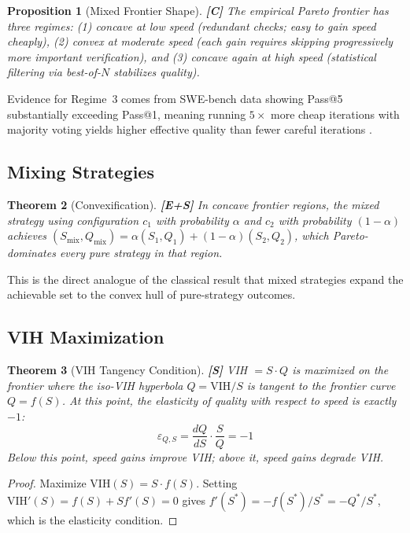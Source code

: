 \documentclass[11pt,a4paper]{article}
\newtheorem{theorem}{Theorem}[section]
\newtheorem{proposition}[theorem]{Proposition}
\theoremstyle{definition}
\theoremstyle{remark}
\newcommand{\VIH}{\mathrm{VIH}}
\begin{document}
\begin{proposition}[Mixed Frontier Shape]\label{prop:shape}
\textbf{[C]} The empirical Pareto frontier has three regimes: (1) concave at low speed (redundant checks; easy to gain speed cheaply), (2) convex at moderate speed (each gain requires skipping progressively more important verification), and (3) concave again at high speed (statistical filtering via best-of-$N$ stabilizes quality).
\end{proposition}

Evidence for Regime~3 comes from SWE-bench data showing Pass@5 substantially exceeding Pass@1, meaning running $5\times$ more cheap iterations with majority voting yields higher effective quality than fewer careful iterations \citep{sweeffi2025}.

\subsection{Mixing Strategies}

\begin{theorem}[Convexification]\label{thm:convex}
\textbf{[E+S]} In concave frontier regions, the mixed strategy using configuration $c_1$ with probability $\alpha$ and $c_2$ with probability $(1-\alpha)$ achieves $(S_{\mathrm{mix}}, Q_{\mathrm{mix}}) = \alpha(S_1, Q_1) + (1-\alpha)(S_2, Q_2)$, which Pareto-dominates every pure strategy in that region.
\end{theorem}

This is the direct analogue of the classical result that mixed strategies expand the achievable set to the convex hull of pure-strategy outcomes.

\subsection{VIH Maximization}

\begin{theorem}[VIH Tangency Condition]\label{thm:tangency}
\textbf{[S]} VIH $= S \cdot Q$ is maximized on the frontier where the iso-VIH hyperbola $Q = \VIH/S$ is tangent to the frontier curve $Q = f(S)$. At this point, the elasticity of quality with respect to speed is exactly $-1$:
\[
    \varepsilon_{Q,S} = \frac{dQ}{dS} \cdot \frac{S}{Q} = -1
\]
Below this point, speed gains improve VIH; above it, speed gains degrade VIH.
\end{theorem}

\begin{proof}
Maximize $\VIH(S) = S \cdot f(S)$. Setting $\VIH'(S) = f(S) + S f'(S) = 0$ gives $f'(S^*) = -f(S^*)/S^* = -Q^*/S^*$, which is the elasticity condition.
\end{proof}
\end{document}
